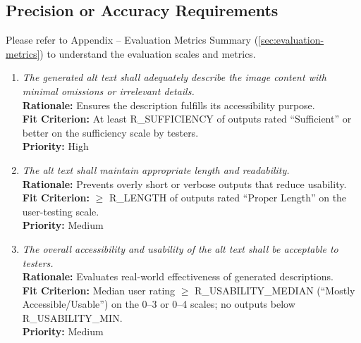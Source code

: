\documentclass[12pt]{article}
\begin{document}
\subsection{Precision or Accuracy Requirements}
Please refer to Appendix – Evaluation Metrics Summary (\ref{sec:evaluation-metrics}) to understand the evaluation scales and metrics.
\begin{enumerate}[label=PR-PAR \arabic*., wide=0pt, leftmargin=*]
\item \emph{The generated alt text shall adequately describe the image content with minimal omissions or irrelevant details.}\\[2mm] 
    {\bf Rationale:} Ensures the description fulfills its accessibility purpose.\\
    {\bf Fit Criterion:} At least R\_SUFFICIENCY of outputs rated “Sufficient” or better on the sufficiency scale by testers.\\
    {\bf Priority:} High

\item \emph{The alt text shall maintain appropriate length and readability.}\\[2mm] 
    {\bf Rationale:} Prevents overly short or verbose outputs that reduce usability.\\
    {\bf Fit Criterion:} $\geq$ R\_LENGTH of outputs rated “Proper Length” on the user-testing scale.\\
    {\bf Priority:} Medium

\item \emph{The overall accessibility and usability of the alt text shall be acceptable to testers.}\\[2mm] 
    {\bf Rationale:} Evaluates real-world effectiveness of generated descriptions.\\
    {\bf Fit Criterion:} Median user rating $\geq$ R\_USABILITY\_MEDIAN (“Mostly Accessible/Usable”) on the 0–3 or 0–4 scales; no outputs below R\_USABILITY\_MIN.\\
    {\bf Priority:} Medium
\end{enumerate}
\end{document}
